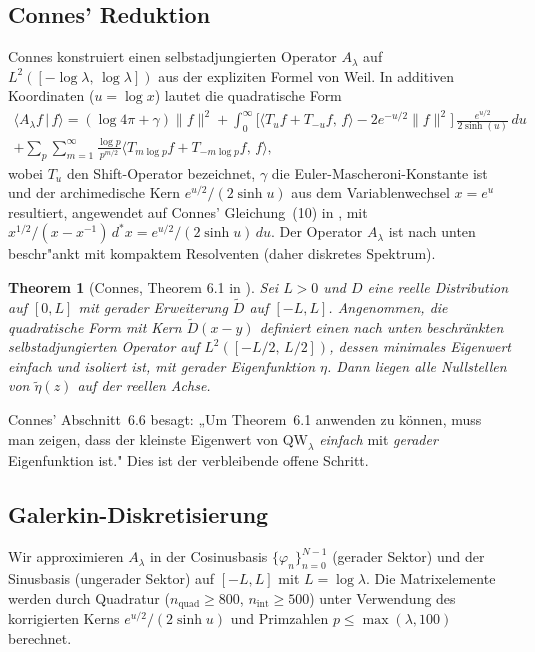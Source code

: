 \documentclass[12pt,a4paper]{article}
\newtheorem{theorem}{Theorem}[section]
\theoremstyle{definition}
\theoremstyle{remark}
\begin{document}
\subsection{Connes' Reduktion}

Connes konstruiert einen selbstadjungierten Operator $A_\lambda$ auf $L^2([-\log\lambda,\,\log\lambda])$ aus der expliziten Formel von Weil. In additiven Koordinaten ($u = \log x$) lautet die quadratische Form
\begin{multline*}
  \langle A_\lambda f \,|\, f \rangle = (\log 4\pi + \gamma)\|f\|^2
  + \int_0^\infty \Big[\langle T_u f + T_{-u} f,\, f \rangle - 2e^{-u/2}\|f\|^2\Big]\,\frac{e^{u/2}}{2\sinh(u)}\,du \\
  + \sum_p \sum_{m=1}^\infty \frac{\log p}{p^{m/2}} \langle T_{m\log p} f + T_{-m\log p} f,\, f \rangle,
\end{multline*}
wobei $T_u$ den Shift-Operator bezeichnet, $\gamma$ die Euler-Mascheroni-Konstante ist und der archimedische Kern $e^{u/2}/(2\sinh u)$ aus dem Variablenwechsel $x = e^u$ resultiert, angewendet auf Connes' Gleichung~(10) in \cite{Connes2025}, mit $x^{1/2}/(x-x^{-1})\,d^*\!x = e^{u/2}/(2\sinh u)\,du$. Der Operator $A_\lambda$ ist nach unten beschr"ankt mit kompaktem Resolventen (daher diskretes Spektrum).

\begin{theorem}[Connes, Theorem 6.1 in \cite{Connes2025}]
Sei $L > 0$ und $D$ eine reelle Distribution auf $[0,L]$ mit gerader Erweiterung $\tilde{D}$ auf $[-L,L]$. Angenommen, die quadratische Form mit Kern $\tilde{D}(x-y)$ definiert einen nach unten beschränkten selbstadjungierten Operator auf $L^2([-L/2,\,L/2])$, dessen minimales Eigenwert einfach und isoliert ist, mit gerader Eigenfunktion $\eta$. Dann liegen alle Nullstellen von $\tilde{\eta}(z)$ auf der reellen Achse.
\end{theorem}

\noindent Connes' Abschnitt~6.6 besagt: „Um Theorem~6.1 anwenden zu können, muss man zeigen, dass der kleinste Eigenwert von $\mathrm{QW}_\lambda$ \emph{einfach} mit \emph{gerader} Eigenfunktion ist." Dies ist der verbleibende offene Schritt.

\subsection{Galerkin-Diskretisierung}

Wir approximieren $A_\lambda$ in der Cosinusbasis $\{\varphi_n\}_{n=0}^{N-1}$ (gerader Sektor) und der Sinusbasis (ungerader Sektor) auf $[-L,L]$ mit $L = \log\lambda$. Die Matrixelemente werden durch Quadratur ($n_{\mathrm{quad}} \geq 800$, $n_{\mathrm{int}} \geq 500$) unter Verwendung des korrigierten Kerns $e^{u/2}/(2\sinh u)$ und Primzahlen $p \leq \max(\lambda, 100)$ berechnet.
\end{document}
